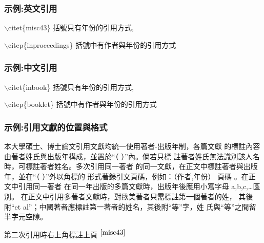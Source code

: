 \subsubsection{示例:英文引用}
$\backslash$citet\{misc43\} 括號只有年份的引用方式,\citet{misc43}\label{misc43}

$\backslash$citep\{inproceedings\} 括號中有作者與年份的引用方式\citep{inproceedings}

\subsubsection{示例:中文引用}
$\backslash$citet\{inbook\} 括號只有年份的引用方式,\citet{inbook}\label{inbook}

$\backslash$citep\{booklet\} 括號中有作者與年份的引用方式\citep{booklet}


\clearpage
\subsubsection{示例:引用文獻的位置與格式}
\par 本大學碩士、博士論文引用文獻均統一使用著者-出版年制，各篇文獻
的標註內容由著者姓氏與出版年構成，並置於“（ ）”內。倘若只標
註著者姓氏無法識別該人名時，可標註著者姓名。多次引用同一著者
的同一文獻，在正文中標註著者與出版年，並在“（ ）”外以角標的
形式著錄引文頁碼，例如：（作者,年份）
頁碼 。在正文中引用同一著者
在同一年出版的多篇文獻時，出版年後應用小寫字母 a,b,c,…區別。
在正文中引用多著者文獻時，對歐美著者只需標註第一個著者的姓，
其後附“et al”；中國著者應標註第一著者的姓名，其後附“等”字，姓
氏與“等”之間留半字元空隙。

第二次引用時右上角標註上頁 \citet{misc43}$^{\pageref{misc43}}$
